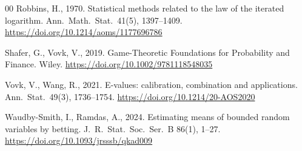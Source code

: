 \documentclass[preprint,12pt]{elsarticle}
\begin{document}
\begin{thebibliography}{00}
Robbins, H., 1970. Statistical methods related to the law of the iterated logarithm. Ann.\ Math.\ Stat.\ 41(5), 1397--1409. \url{https://doi.org/10.1214/aoms/1177696786}

Shafer, G., Vovk, V., 2019. Game-Theoretic Foundations for Probability and Finance. Wiley. \url{https://doi.org/10.1002/9781118548035}

Vovk, V., Wang, R., 2021. E-values: calibration, combination and applications. Ann.\ Stat.\ 49(3), 1736--1754. \url{https://doi.org/10.1214/20-AOS2020}

Waudby-Smith, I., Ramdas, A., 2024. Estimating means of bounded random variables by betting. J.\ R.\ Stat.\ Soc.\ Ser.\ B 86(1), 1--27. \url{https://doi.org/10.1093/jrsssb/qkad009}

\end{thebibliography}
\end{document}
